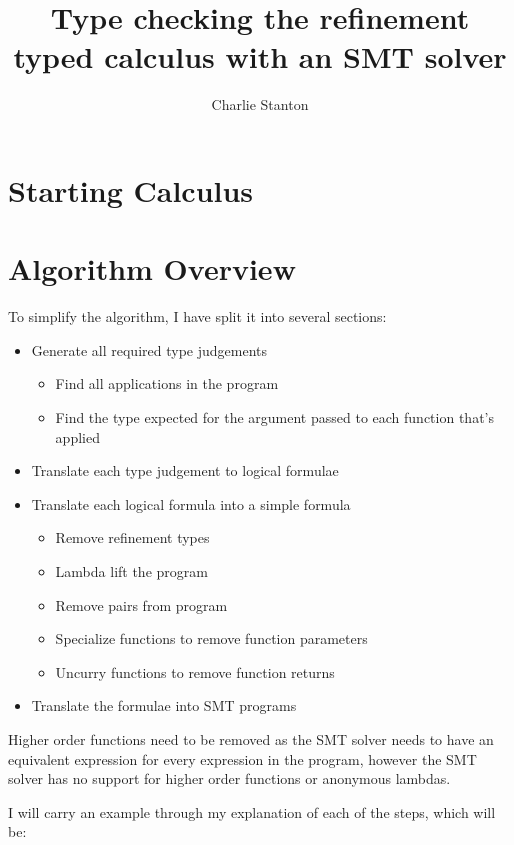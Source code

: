 \documentclass[12pt,a4paper,titlepage]{article}
\title{Type checking the refinement typed calculus with an SMT solver}
\author{Charlie Stanton}
\begin{document}
    \maketitle

    \section{Starting Calculus}

    \section{Algorithm Overview}
    To simplify the algorithm, I have split it into several sections:

    \begin{itemize}
        \item Generate all required type judgements
        \begin{itemize}
            \item Find all applications in the program
            \item Find the type expected for the argument passed to each function that's applied
        \end{itemize}
        \item Translate each type judgement to logical formulae
        \item Translate each logical formula into a simple formula
        \begin{itemize}
            \item Remove refinement types
            \item Lambda lift the program
            \item Remove pairs from program
            \item Specialize functions to remove function parameters
            \item Uncurry functions to remove function returns
        \end{itemize}
        \item Translate the formulae into SMT programs
    \end{itemize}

    Higher order functions need to be removed as the SMT solver needs to have an equivalent expression
    for every expression in the program, however the SMT solver has no support for higher order functions
    or anonymous lambdas.

    I will carry an example through my explanation of each of the steps, which will be:
\end{document}
